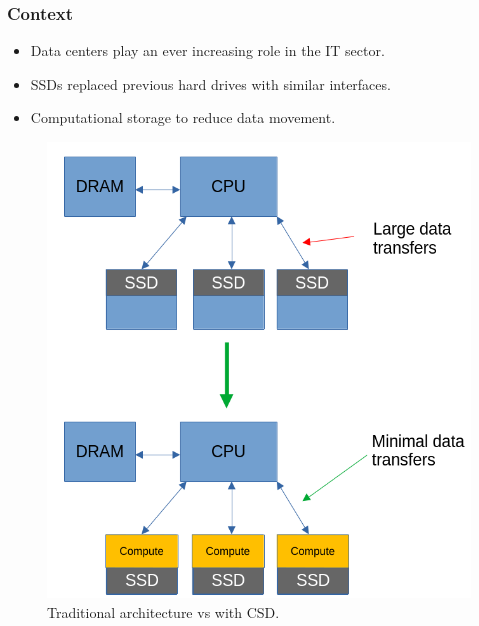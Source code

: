 \begin{frame}[hoved]
	\frametitle{Context}
	\begin{minipage}[t]{0.45\textwidth}
		\begin{itemize}
			\item Data centers play an ever increasing role in the IT sector.
			\item SSDs replaced previous hard drives with similar interfaces.
      \item Computational storage to reduce data movement.
		\end{itemize}
	\end{minipage}
	\hfill
	\begin{minipage}[t]{0.45\textwidth}
		\begin{figure}
			\begin{center}
				\includegraphics[height=0.55\textheight]{figures/CSD.png}
			\end{center}
			\caption{Traditional architecture vs with CSD.}\label{fig:openssd}
		\end{figure}
	\end{minipage}
\end{frame}

